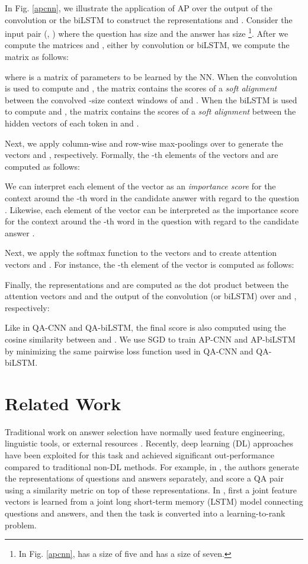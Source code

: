 \documentclass{article}
\begin{document}
In Fig. \ref{apcnn}, 
we illustrate the application of AP over the output of the convolution or the biLSTM to construct the representations  and .
Consider the input pair (, ) where the question has size  and the answer has size \footnote{In Fig. \ref{apcnn},  has a size of five and  has a size of seven.}.
After we compute the matrices  and  ,
either by convolution or biLSTM,
we compute the matrix   as follows:

where  is a matrix of parameters to be learned by the NN.
When the convolution is used to compute  and ,
the matrix  contains the scores of a \emph{soft alignment} between the convolved -size context windows of  and .
When the biLSTM is used to compute  and ,
the matrix  contains the scores of a \emph{soft alignment} between the hidden vectors of each token in  and .

Next, 
we apply column-wise and row-wise max-poolings over  to generate the vectors  and , 
respectively.
Formally, 
the -th elements of the vectors  and  are computed as follows:


We can interpret each element  of the vector  as an \emph{importance score} for the context around the -th word in the candidate answer  with regard to the question .
Likewise,
each element  of the vector  can be interpreted as the importance score for the context around the -th word in the question  with regard to the candidate answer .

Next, 
we apply the softmax function to the vectors  and  to create attention vectors  and .
For instance, 
the -th element of the vector  is computed as follows:


Finally,
the representations  and  are computed as the dot product between the attention vectors  and  and the output of the convolution (or biLSTM) over  and , respectively:



Like in QA-CNN and QA-biLSTM,
the final score is also computed using the cosine similarity between  and .
We use SGD to train AP-CNN and AP-biLSTM by minimizing the same pairwise loss function used in QA-CNN and QA-biLSTM.
 \section{Related Work}
\label{related_work}
Traditional work on answer selection have normally used feature engineering, 
linguistic tools, 
or external
resources \cite{yih2013,wangmengqiu2010,wangmengqiu2007}. Recently,
deep learning (DL) approaches have been  exploited for this task and achieved significant out-performance compared to traditional non-DL methods. For example, in \cite{yu2014,feng2015applying,severyn2015}, the authors generate the representations of questions and answers separately, and score a QA pair using a similarity metric on top of these representations. In \citet{wang2015},
first a joint feature vectors is learned from a joint long short-term memory (LSTM) model connecting questions and answers, 
and then the task is converted into a learning-to-rank problem. 
\end{document}
